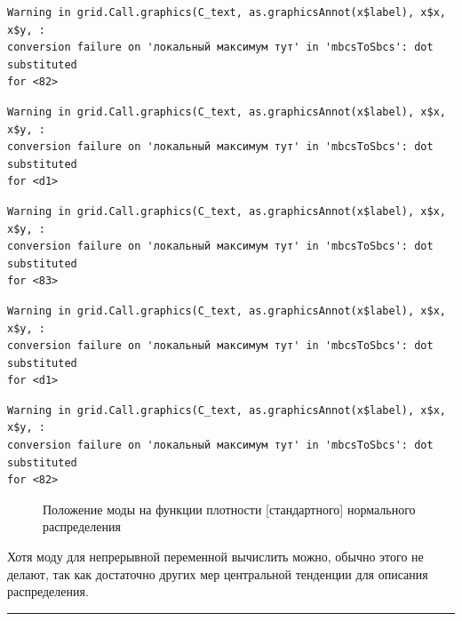 \documentclass[
  letterpaper,
]{scrbook}
\theoremstyle{definition}
\theoremstyle{remark}
\begin{document}
\begin{verbatim}
Warning in grid.Call.graphics(C_text, as.graphicsAnnot(x$label), x$x, x$y, :
conversion failure on 'локальный максимум тут' in 'mbcsToSbcs': dot substituted
for <82>
\end{verbatim}

\begin{verbatim}
Warning in grid.Call.graphics(C_text, as.graphicsAnnot(x$label), x$x, x$y, :
conversion failure on 'локальный максимум тут' in 'mbcsToSbcs': dot substituted
for <d1>
\end{verbatim}

\begin{verbatim}
Warning in grid.Call.graphics(C_text, as.graphicsAnnot(x$label), x$x, x$y, :
conversion failure on 'локальный максимум тут' in 'mbcsToSbcs': dot substituted
for <83>
\end{verbatim}

\begin{verbatim}
Warning in grid.Call.graphics(C_text, as.graphicsAnnot(x$label), x$x, x$y, :
conversion failure on 'локальный максимум тут' in 'mbcsToSbcs': dot substituted
for <d1>
\end{verbatim}

\begin{verbatim}
Warning in grid.Call.graphics(C_text, as.graphicsAnnot(x$label), x$x, x$y, :
conversion failure on 'локальный максимум тут' in 'mbcsToSbcs': dot substituted
for <82>
\end{verbatim}

\begin{figure}


\caption{\label{fig-continuous-mode}Положение моды на функции плотности
{[}стандартного{]} нормального распределения}

\end{figure}%

Хотя моду для непрерывной переменной вычислить можно, обычно этого не
делают, так как достаточно других мер центральной тенденции для описания
распределения.

\begin{center}\rule{0.5\linewidth}{0.5pt}\end{center}
\end{document}
